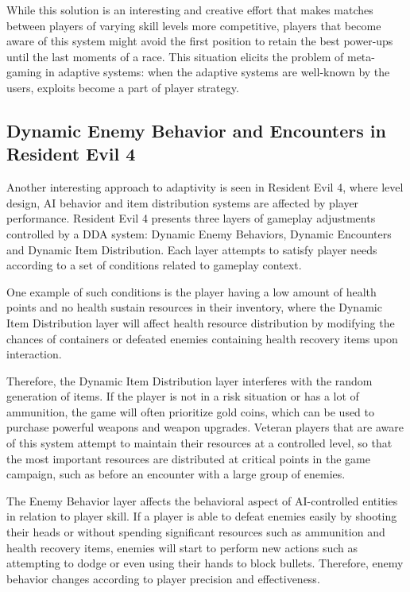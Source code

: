 \documentclass[cic,tc,english]{iiufrgs}
\begin{document}
While this solution is an interesting and creative effort that makes matches between players of varying skill levels more competitive, players that become aware of this system might avoid the first position to retain the best power-ups until the last moments of a race. This situation elicits the problem of meta-gaming in adaptive systems: when the adaptive systems are well-known by the users, exploits become a part of player strategy.

\subsection{Dynamic Enemy Behavior and Encounters in Resident Evil 4}

Another interesting approach to adaptivity is seen in Resident Evil 4, where level design, AI behavior and item distribution systems are affected by player performance. Resident Evil 4 presents three layers of gameplay adjustments controlled by a DDA system: Dynamic Enemy Behaviors, Dynamic Encounters and Dynamic Item Distribution. Each layer attempts to satisfy player needs according to a set of conditions related to gameplay context.

One example of such conditions is the player having a low amount of health points and no health sustain resources in their inventory, where the Dynamic Item Distribution layer will affect health resource distribution by modifying the chances of containers or defeated enemies containing health recovery items upon interaction.

Therefore, the Dynamic Item Distribution layer interferes with the random generation of items. If the player is not in a risk situation or has a lot of ammunition, the game will often prioritize gold coins, which can be used to purchase powerful weapons and weapon upgrades.  Veteran players that are aware of this system attempt to maintain their resources at a controlled level, so that the most important resources are distributed at critical points in the game campaign, such as before an encounter with a large group of enemies.

The Enemy Behavior layer affects the behavioral aspect of AI-controlled entities in relation to player skill. If a player is able to defeat enemies easily by shooting their heads or without spending significant resources such as ammunition and health recovery items, enemies will start to perform new actions such as attempting to dodge or even using their hands to block bullets. Therefore, enemy behavior changes according to player precision and effectiveness.
\end{document}
